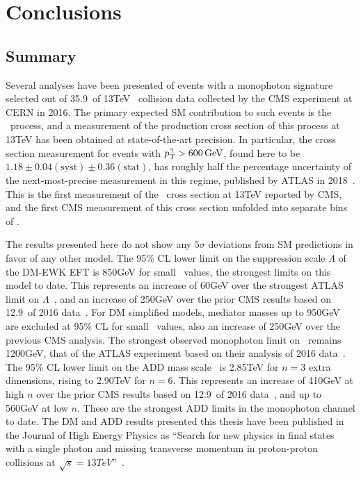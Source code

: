 \chapter{Conclusions} \label{chap:conclusions}
\section{Summary} \label{sec:conclusions_summary}
Several analyses have been presented of events with a monophoton signature selected out of 35.9\fbinv\ of 13\unit{TeV} \Pp\Pp\ collision
data collected by the CMS experiment at CERN in 2016. The primary expected SM contribution to such events is
the \zinvg\ process, and a measurement of the production cross section of this process at 13\unit{TeV} has been obtained at state-of-the-art
precision. In particular, the cross section measurement for events with $\pTgamma > 600\unit{GeV}$, found here to be
$1.18 \pm 0.04\mathrm{(syst)} \pm 0.36\mathrm{(stat)}$, has roughly half the percentage uncertainty of the next-most-precise
measurement in this regime, published by ATLAS in 2018~\cite{ref:CERN-EP-2018-220}. This is the first measurement of the \zinvg\ cross section
at 13\unit{TeV} reported by CMS, and the first CMS measurement of this cross section unfolded into separate bins of \pTgamma.

The results presented here do not show any $5\sigma$ deviations from SM predictions in favor of any other model.
The 95\% CL lower limit on the suppression scale $\Lambda$ of the DM-EWK EFT is 850\unit{GeV} for small \mdm\ values, the strongest
limits on this model to date. This represents an increase of 60\unit{GeV} over the strongest ATLAS limit on $\Lambda$~\cite{ref:epjc/s10052-017-4965-8},
and an increase of 250\unit{GeV} over the prior CMS results based on 12.9\fbinv\ of 2016 data~\cite{ref:JHEP10(2017)073}.
For DM simplified models, mediator masses up to 950\unit{GeV} are excluded at 95\% CL for small \mdm\ values,
also an increase of 250\unit{GeV} over the previous CMS analysis. The strongest observed monophoton limit on \mmed\ remains
1200\unit{GeV}, that of the ATLAS experiment based on their analysis of 2016 data~\cite{ref:epjc/s10052-017-4965-8}.
The 95\% CL lower limit on the ADD mass scale \mD\ is 2.85\unit{TeV} for $n = 3$ extra dimensions, rising to 2.90\unit{TeV} for $n = 6$.
This represents an increase of 410\unit{GeV} at high $n$ over the prior CMS results based on 12.9\fbinv\ of 2016 data~\cite{ref:JHEP10(2017)073},
and up to 560\unit{GeV} at low $n$. These are the strongest ADD limits in the monophoton channel to date.
The DM and ADD results presented this thesis have been published in the Journal of High Energy Physics as ``Search for new physics in final states with
a single photon and missing transverse momentum in proton-proton collisions at $\sqrt{s} = 13\unit{TeV}$''~\cite{ref:JHEP02(2019)074}.

